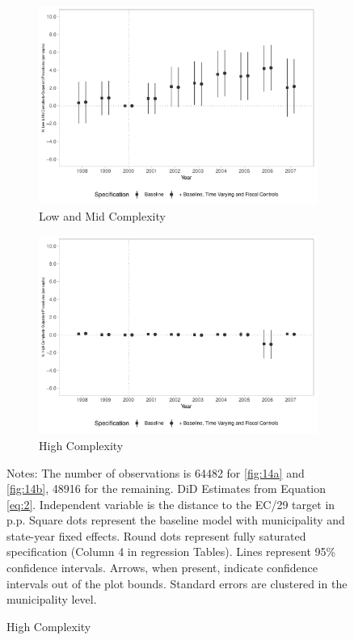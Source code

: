 \begin{figure}[h!]
\begin{center}
    \begin{subfigure}{0.48\textwidth}
        \centering
        \caption{\scriptsize Low and Mid Complexity}\label{fig:14c}
        \includegraphics[width=\textwidth]{plots/sia_nprod_amb_lc_mun_pcapita_dist_ec29_baseline_dist_ec29_baseline_14.pdf}
    \end{subfigure}
    \begin{subfigure}{0.48\textwidth}
        \centering
        \caption{\scriptsize High Complexity}\label{fig:14d}
        \includegraphics[width=\textwidth]{plots/sia_nprod_amb_hc_mun_pcapita_dist_ec29_baseline_dist_ec29_baseline_14.pdf}
    \end{subfigure}
    
    \end{center}
    
        \scriptsize{Notes: The number of observations is 64482 for \ref{fig:14a} and \ref{fig:14b}, 48916 for the remaining. DiD Estimates from Equation \ref{eq:2}. Independent variable is the distance to the EC/29 target in p.p. Square dots represent the baseline model with municipality and state-year fixed effects. Round dots represent fully saturated specification (Column 4 in regression Tables). Lines represent 95\% confidence intervals. Arrows, when present, indicate confidence intervals out of the plot bounds. Standard errors are clustered in the municipality level.}
    
\end{figure}